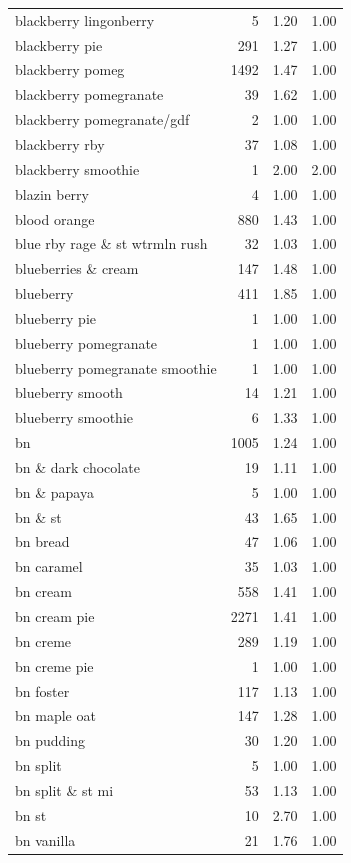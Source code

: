 \begin{table}
\begin{tabular}{lrrr}
blackberry lingonberry & 5 & 1.20 & 1.00 \\
blackberry pie & 291 & 1.27 & 1.00 \\
blackberry pomeg & 1492 & 1.47 & 1.00 \\
blackberry pomegranate & 39 & 1.62 & 1.00 \\
blackberry pomegranate/gdf & 2 & 1.00 & 1.00 \\
blackberry rby & 37 & 1.08 & 1.00 \\
blackberry smoothie & 1 & 2.00 & 2.00 \\
blazin berry & 4 & 1.00 & 1.00 \\
blood orange & 880 & 1.43 & 1.00 \\
blue rby rage \& st wtrmln rush & 32 & 1.03 & 1.00 \\
blueberries \& cream & 147 & 1.48 & 1.00 \\
blueberry & 411 & 1.85 & 1.00 \\
blueberry pie & 1 & 1.00 & 1.00 \\
blueberry pomegranate & 1 & 1.00 & 1.00 \\
blueberry pomegranate smoothie & 1 & 1.00 & 1.00 \\
blueberry smooth & 14 & 1.21 & 1.00 \\
blueberry smoothie & 6 & 1.33 & 1.00 \\
bn & 1005 & 1.24 & 1.00 \\
bn \& dark chocolate & 19 & 1.11 & 1.00 \\
bn \& papaya & 5 & 1.00 & 1.00 \\
bn \& st & 43 & 1.65 & 1.00 \\
bn bread & 47 & 1.06 & 1.00 \\
bn caramel & 35 & 1.03 & 1.00 \\
bn cream & 558 & 1.41 & 1.00 \\
bn cream pie & 2271 & 1.41 & 1.00 \\
bn creme & 289 & 1.19 & 1.00 \\
bn creme pie & 1 & 1.00 & 1.00 \\
bn foster & 117 & 1.13 & 1.00 \\
bn maple oat & 147 & 1.28 & 1.00 \\
bn pudding & 30 & 1.20 & 1.00 \\
bn split & 5 & 1.00 & 1.00 \\
bn split \& st mi & 53 & 1.13 & 1.00 \\
bn st & 10 & 2.70 & 1.00 \\
bn vanilla & 21 & 1.76 & 1.00 \\

\end{tabular}
\end{table}
